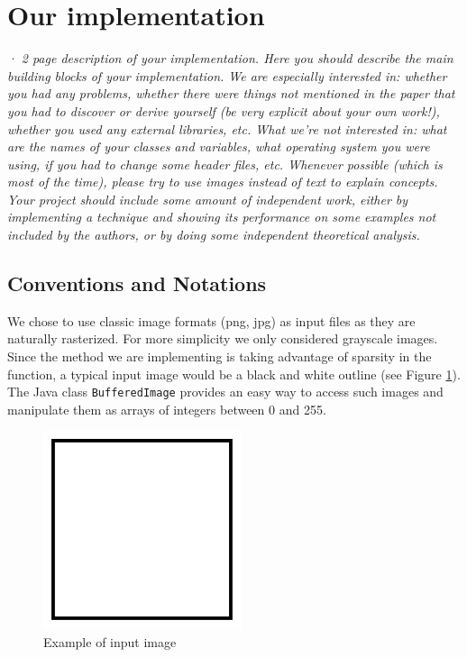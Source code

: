 \documentclass[10pt,a4paper]{article}			%
\begin{document}
	
	\section{Our implementation}
	
	\textit{· 2 page description of your implementation. Here you should describe the main building blocks of your implementation. We are especially interested in: whether you had any problems, whether there were things not mentioned in the paper that you had to discover or derive yourself (be very explicit about your own work!), whether you used any external libraries, etc. What we're not interested in: what are the names of your classes and variables, what operating system you were using, if you had to change some header files, etc. Whenever possible (which is most of the time), please try to use images instead of text to explain concepts.\\
	Your project should include some amount of independent work, either by implementing a technique and showing its performance on some examples not included by the authors, or by doing some independent theoretical analysis.\\}

	\subsection {Conventions and Notations}
We chose to use classic image formats (png, jpg) as input files as they are naturally rasterized. For more simplicity we only considered grayscale images. Since the method we are implementing is taking advantage of sparsity in the function, a typical input image would be a black and white outline (see Figure \ref{exemple_carre}). The Java class \texttt{BufferedImage} provides an easy way to access such images and manipulate them as arrays of integers between 0 and 255. 
\begin{figure}[h]
\begin{center}
\includegraphics[scale=0.5]{img/carre.png}
\caption{Example of input image}
\label{exemple_carre}
\end{center}
\end{figure}
\end{document}
